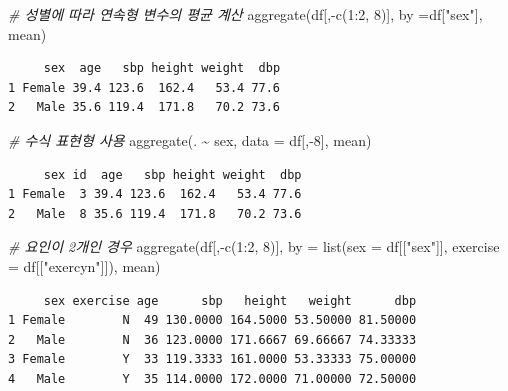 \documentclass[
  11pt,
]{krantz}
\newenvironment{Shaded}{\begin{snugshade}}{\end{snugshade}}
\newcommand{\AttributeTok}[1]{\textcolor[rgb]{0.61,0.61,0.61}{#1}}
\newcommand{\CommentTok}[1]{\textcolor[rgb]{0.37,0.37,0.37}{\textit{#1}}}
\newcommand{\DecValTok}[1]{\textcolor[rgb]{0.06,0.06,0.06}{#1}}
\newcommand{\FunctionTok}[1]{\textcolor[rgb]{0,0,0}{#1}}
\newcommand{\NormalTok}[1]{#1}
\newcommand{\SpecialCharTok}[1]{\textcolor[rgb]{0,0,0}{#1}}
\newcommand{\StringTok}[1]{\textcolor[rgb]{0.5,0.5,0.5}{#1}}
\begin{document}
\begin{Shaded}
\begin{Highlighting}[]
\CommentTok{\# 성별에 따라 연속형 변수의 평균 계산}
\FunctionTok{aggregate}\NormalTok{(df[,}\SpecialCharTok{{-}}\FunctionTok{c}\NormalTok{(}\DecValTok{1}\SpecialCharTok{:}\DecValTok{2}\NormalTok{, }\DecValTok{8}\NormalTok{)], }\AttributeTok{by =}\NormalTok{df[}\StringTok{"sex"}\NormalTok{], mean)}
\end{Highlighting}
\end{Shaded}

\begin{verbatim}
     sex  age   sbp height weight  dbp
1 Female 39.4 123.6  162.4   53.4 77.6
2   Male 35.6 119.4  171.8   70.2 73.6
\end{verbatim}

\begin{Shaded}
\begin{Highlighting}[]
\CommentTok{\# 수식 표현형 사용}
\FunctionTok{aggregate}\NormalTok{(. }\SpecialCharTok{\textasciitilde{}}\NormalTok{ sex, }
          \AttributeTok{data =}\NormalTok{ df[,}\SpecialCharTok{{-}}\DecValTok{8}\NormalTok{], }
\NormalTok{          mean)}
\end{Highlighting}
\end{Shaded}

\begin{verbatim}
     sex id  age   sbp height weight  dbp
1 Female  3 39.4 123.6  162.4   53.4 77.6
2   Male  8 35.6 119.4  171.8   70.2 73.6
\end{verbatim}

\begin{Shaded}
\begin{Highlighting}[]
\CommentTok{\# 요인이 2개인 경우}
\FunctionTok{aggregate}\NormalTok{(df[,}\SpecialCharTok{{-}}\FunctionTok{c}\NormalTok{(}\DecValTok{1}\SpecialCharTok{:}\DecValTok{2}\NormalTok{, }\DecValTok{8}\NormalTok{)], }
          \AttributeTok{by =} \FunctionTok{list}\NormalTok{(}\AttributeTok{sex =}\NormalTok{ df[[}\StringTok{"sex"}\NormalTok{]], }\AttributeTok{exercise =}\NormalTok{ df[[}\StringTok{"exercyn"}\NormalTok{]]), }
\NormalTok{          mean)}
\end{Highlighting}
\end{Shaded}

\begin{verbatim}
     sex exercise age      sbp   height   weight      dbp
1 Female        N  49 130.0000 164.5000 53.50000 81.50000
2   Male        N  36 123.0000 171.6667 69.66667 74.33333
3 Female        Y  33 119.3333 161.0000 53.33333 75.00000
4   Male        Y  35 114.0000 172.0000 71.00000 72.50000
\end{verbatim}
\end{document}
